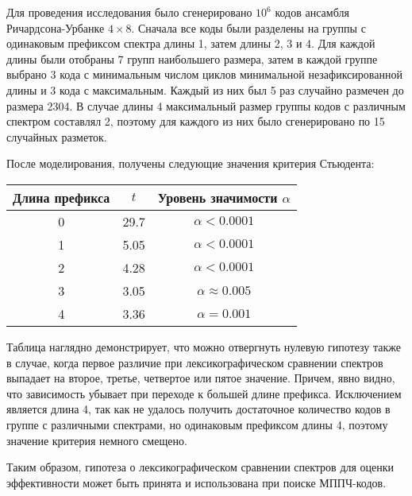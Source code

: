  Для проведения исследования было сгенерировано $10^6$ кодов ансамбля Ричардсона-Урбанке $4 \times 8$.
 Сначала все коды были разделены на группы с одинаковым префиксом спектра длины 1, затем длины 2, 3 и 4.
 Для каждой длины были отобраны 7 групп наибольшего размера, затем в каждой группе выбрано 3 кода с минимальным
 числом циклов минимальной незафиксированной длины и 3 кода с максимальным. Каждый из них
 был 5 раз случайно размечен до размера 2304. В случае длины 4 максимальный размер группы кодов 
 с различным спектром составлял 2, поэтому для каждого из них было сгенерировано по 15 случайных разметок. 

После моделирования, получены следующие значения критерия Стьюдента:

\begin{tabular}{|c|c|c|}
	\hline
	Длина префикса & $t$ & Уровень значимости $\alpha$\\
	\hline
	0 & 29.7 &  $\alpha < 0.0001$\\
	\hline
	1 & 5.05 &  $\alpha < 0.0001$\\
	\hline
	2 & 4.28 & $\alpha < 0.0001$ \\
	\hline
	3 & 3.05 & $\alpha \approx 0.005$ \\
	\hline
	4 & 3.36 & $\alpha = 0.001$ \\
	\hline
\end{tabular}

Таблица наглядно демонстрирует, что можно отвергнуть нулевую гипотезу также в случае, когда первое
различие при лексикографическом сравнении спектров выпадает на второе, третье, четвертое или пятое значение.
Причем, явно видно, что зависимость убывает при переходе к большей длине префикса. Исключением
является длина 4, так как не удалось получить достаточное количество кодов в группе с различными 
спектрами, но одинаковым префиксом длины 4, поэтому значение критерия немного смещено.

Таким образом, гипотеза о лексикографическом сравнении спектров для оценки эффективности может быть
принята и использована при поиске МППЧ-кодов.



















































